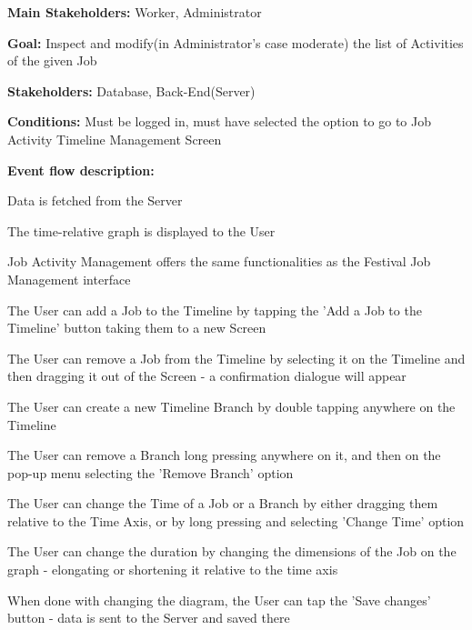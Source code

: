 			\noindent {}
			\begin{packed_item}
				\item \textbf{Main Stakeholders:} Worker, Administrator
				\item \textbf{Goal:} Inspect and modify(in Administrator's case moderate) the list of Activities of the given Job
				\item \textbf{Stakeholders: } Database, Back-End(Server)
				\item \textbf{Conditions: } Must be logged in, must have selected the option to go to Job Activity Timeline Management Screen
				\item \textbf{Event flow description: }
				\begin{packed_enum}
					\item Data is fetched from the Server
					\item The time-relative graph is displayed to the User
					\item Job Activity Management offers the same functionalities as the Festival Job Management interface
					\item The User can add a Job to the Timeline by tapping the 'Add a Job to the Timeline' button taking them to a new Screen
					\item The User can remove a Job from the Timeline by selecting it on the Timeline and then dragging it out of the Screen - a confirmation dialogue will appear
					\item The User can create a new Timeline Branch by double tapping anywhere on the Timeline
					\item The User can remove a Branch long pressing anywhere on it, and then on the pop-up menu selecting the 'Remove Branch' option
					\item The User can change the Time of a Job or a Branch by either dragging them relative to the Time Axis, or by long pressing and selecting 'Change Time' option
					\item The User can change the duration by changing the dimensions of the Job on the graph - elongating or shortening it relative to the time axis
					\item When done with changing the diagram, the User can tap the 'Save changes' button - data is sent to the Server and saved there
					\item 
				\end{packed_enum}
				

\end{packed_item}
